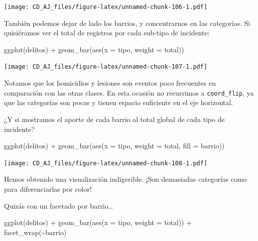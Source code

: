 \documentclass[
]{book}
\newenvironment{Shaded}{\begin{snugshade}}{\end{snugshade}}
\newcommand{\AttributeTok}[1]{\textcolor[rgb]{0.77,0.63,0.00}{#1}}
\newcommand{\FunctionTok}[1]{\textcolor[rgb]{0.00,0.00,0.00}{#1}}
\newcommand{\NormalTok}[1]{#1}
\newcommand{\SpecialCharTok}[1]{\textcolor[rgb]{0.00,0.00,0.00}{#1}}
\begin{document}
\texttt{[image: CD\_AJ\_files/figure-latex/unnamed-chunk-106-1.pdf]}

También podemos dejar de lado los barrios, y concentrarnos en las categorías. Si quisiéramos ver el total de registros por cada sub-tipo de incidente:

\begin{Shaded}
\begin{Highlighting}[]
\FunctionTok{ggplot}\NormalTok{(delitos) }\SpecialCharTok{+}
    \FunctionTok{geom\_bar}\NormalTok{(}\FunctionTok{aes}\NormalTok{(}\AttributeTok{x =}\NormalTok{ tipo, }\AttributeTok{weight =}\NormalTok{ total)) }
\end{Highlighting}
\end{Shaded}

\texttt{[image: CD\_AJ\_files/figure-latex/unnamed-chunk-107-1.pdf]}

Notamos que los homicidios y lesiones son eventos poco frecuentes en comparación con las otras clases. En esta ocasión no recurrimos a \texttt{coord\_flip}, ya que las categorías son pocas y tienen espacio suficiente en el eje horizontal.

¿Y si mostramos el aporte de cada barrio al total global de cada tipo de incidente?

\begin{Shaded}
\begin{Highlighting}[]
\FunctionTok{ggplot}\NormalTok{(delitos) }\SpecialCharTok{+}
    \FunctionTok{geom\_bar}\NormalTok{(}\FunctionTok{aes}\NormalTok{(}\AttributeTok{x =}\NormalTok{ tipo, }\AttributeTok{weight =}\NormalTok{ total, }\AttributeTok{fill =}\NormalTok{ barrio)) }
\end{Highlighting}
\end{Shaded}

\texttt{[image: CD\_AJ\_files/figure-latex/unnamed-chunk-108-1.pdf]}

Hemos obtenido una visualización indigerible. ¡Son demasiadas categorías como para diferenciarlas por color!

Quizás con un facetado por barrio\ldots{}

\begin{Shaded}
\begin{Highlighting}[]
\FunctionTok{ggplot}\NormalTok{(delitos) }\SpecialCharTok{+}
    \FunctionTok{geom\_bar}\NormalTok{(}\FunctionTok{aes}\NormalTok{(}\AttributeTok{x =}\NormalTok{ tipo, }\AttributeTok{weight =}\NormalTok{ total)) }\SpecialCharTok{+}
    \FunctionTok{facet\_wrap}\NormalTok{(}\SpecialCharTok{\textasciitilde{}}\NormalTok{barrio)}
\end{Highlighting}
\end{Shaded}
\end{document}
